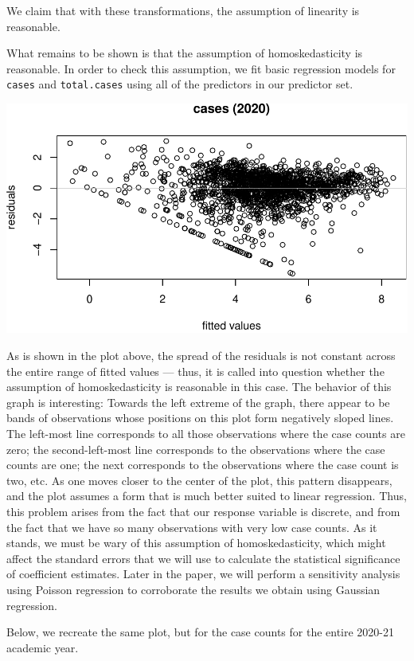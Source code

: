 \documentclass[
]{article}
\begin{document}
We claim that with these transformations, the assumption of linearity is
reasonable.

What remains to be shown is that the assumption of homoskedasticity is
reasonable. In order to check this assumption, we fit basic regression
models for \texttt{cases} and \texttt{total.cases} using all of the
predictors in our predictor set.

\includegraphics{final_files/figure-latex/unnamed-chunk-13-1.pdf}

As is shown in the plot above, the spread of the residuals is not
constant across the entire range of fitted values --- thus, it is called
into question whether the assumption of homoskedasticity is reasonable
in this case. The behavior of this graph is interesting: Towards the
left extreme of the graph, there appear to be bands of observations
whose positions on this plot form negatively sloped lines. The left-most
line corresponds to all those observations where the case counts are
zero; the second-left-most line corresponds to the observations where
the case counts are one; the next corresponds to the observations where
the case count is two, etc. As one moves closer to the center of the
plot, this pattern disappears, and the plot assumes a form that is much
better suited to linear regression. Thus, this problem arises from the
fact that our response variable is discrete, and from the fact that we
have so many observations with very low case counts. As it stands, we
must be wary of this assumption of homoskedasticity, which might affect
the standard errors that we will use to calculate the statistical
significance of coefficient estimates. Later in the paper, we will
perform a sensitivity analysis using Poisson regression to corroborate
the results we obtain using Gaussian regression.

Below, we recreate the same plot, but for the case counts for the entire
2020-21 academic year.
\end{document}
